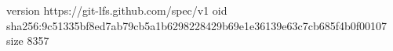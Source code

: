 version https://git-lfs.github.com/spec/v1
oid sha256:9c51335bf8ed7ab79cb5a1b6298228429b69e1e36139e63c7cb685f4b0f00107
size 8357
